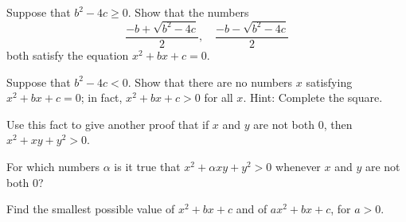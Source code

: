 \Newpage
\begin{problem} %
	\label{nprop:p:18}
	\hfill

	\begin{lenumerate}
		\item \label{nprop:p:18:1}
		      Suppose that $b^2 - 4 c \geq 0$. Show that the numbers
		      $$
			      \frac{-b + \sqrt{b^2 - 4 c}}{2}, \quad \frac{-b - \sqrt{b^2 - 4 c}}{2}
		      $$
		      both satisfy the equation $x^2 + b x + c = 0$.
		\item \label{nprop:p:18:2}
		      Suppose that $b^2 - 4 c < 0$. Show that there are no numbers $x$ satisfying ${x^2 + b x + c = 0}$; in fact, $x^2 + b x + c > 0$ for all $x$. Hint: Complete the square.
		\item \label{nprop:p:18:3}
		      Use this fact to give another proof that if $x$ and $y$ are not both $0$, then ${x^2 + x y + y^2 > 0}$.
		\item \label{nprop:p:18:4}
		      For which numbers $\alpha$ is it true that $x^2 + \alpha x y + y^2 > 0$ whenever $x$ and $y$ are not both $0$?
		\item \label{nprop:p:18:5}
		      Find the smallest possible value of $x^2 + b x + c$ and of $a x^2 + b x + c$, for $a > 0$.
	\end{lenumerate}
\end{problem}

